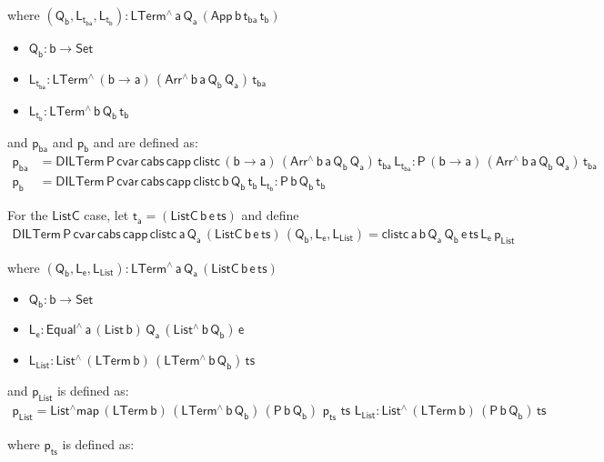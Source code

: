 \documentclass[acmsmall,screen,review,anonymous]{acmart}
\theoremstyle{definition}
\begin{document}
where $\mathsf{(Q_b , L_{t_{ba}}, L_{t_b}) : LTerm^{\wedge}\, a\, Q_a\, (App \,b \,t_{ba} \, t_b)}$
\begin{itemize}
  \item $\mathsf{Q_b : b \to Set}$
  \item $\mathsf{L_{t_{ba}}: LTerm^{\wedge} \, (b \to a)\, (Arr^{\wedge} \, b\, a\, Q_b \, Q_a)\, t_{ba}}$
  \item $\mathsf{L_{t_b}: LTerm^{\wedge} \, b\, Q_b\, t_b}$
\end{itemize}

and $\mathsf{p_{ba}}$
and 
$\mathsf{p_b}$
and are defined as:
\begin{align*}
  \mathsf{p_{ba}} &=  \mathsf{DILTerm\,P\,cvar\,cabs \,capp \,clistc\, (b \to a)\,(Arr^{\wedge} \, b\, a\, Q_b \, Q_a) \, t_{ba}\, L_{t_{ba}}   : P \, (b \to a)\, (Arr^{\wedge} \, b\, a\, Q_b \, Q_a) \, t_{ba} } \\
  \mathsf{p_b   } &=  \mathsf{DILTerm\,P\,cvar\,cabs \,capp \,clistc\, b\, Q_b\, t_b\, L_{t_b}  : P \, b\, Q_b \, t_b } 
\end{align*}

For the $\mathsf{ListC}$ case, let $\mathsf{t_a = (ListC \,b \,e \, ts)} $ and define
\begin{multline*}
  \mathsf{DILTerm \, P\, cvar \, cabs\, capp\, clistc \, a\, Q_a\, (ListC \,b \,e \, ts) \, (Q_b , L_e, L_{List})
  = clistc \,a\,b\,Q_a\, Q_b\, e\, ts\, L_e\, p_{List} }
\end{multline*}


where $\mathsf{(Q_b , L_e, L_{List}): LTerm^{\wedge}\, a\, Q_a\, (ListC \,b \,e \, ts)}$
\begin{itemize}
  \item $\mathsf{Q_b : b \to Set}$
  \item $\mathsf{L_e : Equal^{\wedge}\, a\, (List\,b)\, Q_a\, (List^{\wedge}\, b\, Q_b)\, e}$
  \item $\mathsf{L_{List}: List^{\wedge} \, (LTerm\, b) \, (LTerm^{\wedge}\, b\, Q_b) \, ts}$
\end{itemize}

and $\mathsf{p_{List}}$ is defined as:
\begin{multline*}
  \mathsf{p_{List} = List^{\wedge}map \, (LTerm\, b) \, (LTerm^{\wedge} \, b \, Q_b)\, 
    (P\,b\,Q_b)\, \,p_{ts} \,\, ts\,\, L_{List}  : List^{\wedge}\, (LTerm\,b) \, (P\,b\,Q_b) \, ts}
\end{multline*}

where $\mathsf{p_{ts}}$ is defined as:
\end{document}
